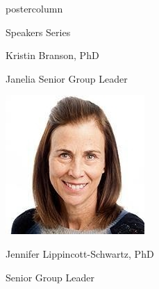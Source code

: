 \documentclass{beamer}
\begin{document}
\begin{frame}
\begin{columns}
\begin{column}{.33\textwidth}
\begin{beamercolorbox}[center,wd=\textwidth]{postercolumn}
\begin{minipage}[T]{.95\textwidth}
{\begin{myblock}{Speakers Series}
\begin{addmargin}[1em]{1em}
\begin{minipage}{0.4\linewidth}
                    \centerline{Kristin Branson, PhD}\newline
                    \centerline{Janelia Senior Group Leader}
                \end{minipage}
            \end{addmargin}
            \vspace{1cm}

            \begin{addmargin}[1em]{1em}
                \centering
                \begin{minipage}{0.4\linewidth}
                    \includegraphics[width=\linewidth]{img/jennifer.png}
                    \centerline{Jennifer Lippincott-Schwartz, PhD}\newline
                    \centerline{Senior Group Leader}
                \end{minipage}
                \hspace{0.75cm}
                \begin{minipage}{0.4\linewidth}

\end{minipage}
\end{addmargin}
\end{myblock}}
\end{minipage}
\end{beamercolorbox}
\end{column}
\end{columns}
\end{frame}
\end{document}
